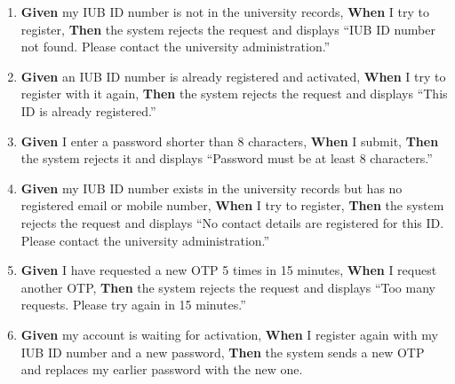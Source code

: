{\begin{enumerate}
  \item \textbf{Given} my IUB ID number is not in the university records, \textbf{When} I try to register, \textbf{Then} the system rejects the request and displays ``IUB ID number not found. Please contact the university administration.''
  \item \textbf{Given} an IUB ID number is already registered and activated, \textbf{When} I try to register with it again, \textbf{Then} the system rejects the request and displays ``This ID is already registered.''
  \item \textbf{Given} I enter a password shorter than 8 characters, \textbf{When} I submit, \textbf{Then} the system rejects it and displays ``Password must be at least 8 characters.''
  \item \textbf{Given} my IUB ID number exists in the university records but has no registered email or mobile number, \textbf{When} I try to register, \textbf{Then} the system rejects the request and displays ``No contact details are registered for this ID. Please contact the university administration.''
  \item \textbf{Given} I have requested a new OTP 5 times in 15 minutes, \textbf{When} I request another OTP, \textbf{Then} the system rejects the request and displays ``Too many requests. Please try again in 15 minutes.''
  \item \textbf{Given} my account is waiting for activation, \textbf{When} I register again with my IUB ID number and a new password, \textbf{Then} the system sends a new OTP and replaces my earlier password with the new one.
\end{enumerate}}
\medskip
 
